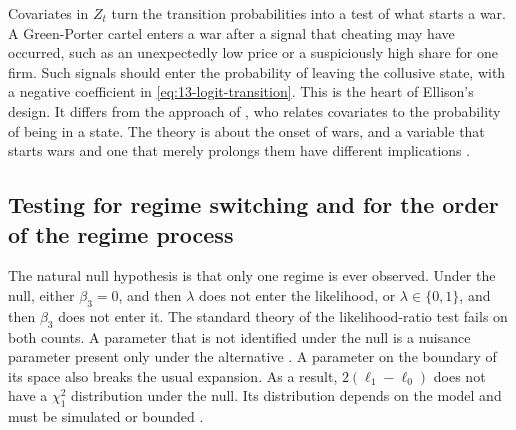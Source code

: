 Covariates in $Z_t$ turn the transition probabilities into a test of what starts a war. A Green-Porter cartel enters
a war after a signal that cheating may have occurred, such as an unexpectedly low price or a suspiciously high share
for one firm. Such signals should enter the probability of leaving the collusive state, with a negative coefficient
in \eqref{eq:13-logit-transition}. This is the heart of Ellison's design. It differs from the approach of
\citet{Hajivassiliou1989}, who relates covariates to the probability of being in a state. The theory is about the
onset of wars, and a variable that starts wars and one that merely prolongs them have different implications
\citep[p.~40]{Ellison1994}.

\subsection{Testing for regime switching and for the order of the regime process}\label{sec:13-tests}

The natural null hypothesis is that only one regime is ever observed. Under the null, either $\beta_3 = 0$, and
then $\lambda$ does not enter the likelihood, or $\lambda \in \{0,1\}$, and then $\beta_3$ does not enter it. The
standard theory of the likelihood-ratio test fails on both counts. A parameter that is not identified under the
null is a nuisance parameter present only under the alternative \citep{Davies1987}. A parameter on the boundary
of its space also breaks the usual expansion. As a result, $2(\ell_1 - \ell_0)$ does not have a $\chi^2_1$
distribution under the null. Its distribution depends on the model and must be simulated or bounded
\citep{Hansen1992}.

